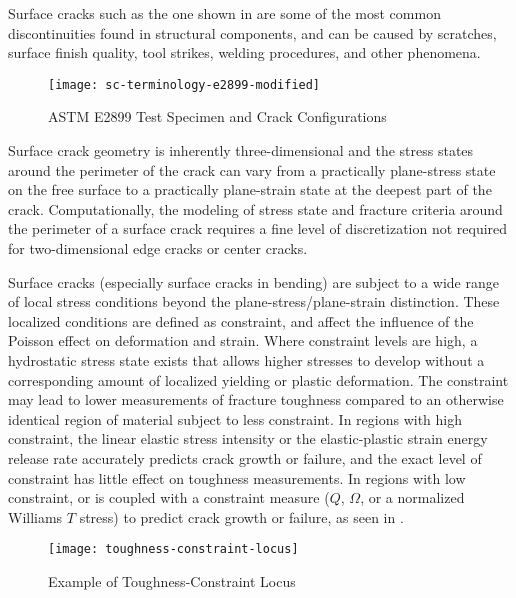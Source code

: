 Surface cracks such as the one shown in  are some of the most common discontinuities found in structural components, and can be caused by scratches, surface finish quality, tool strikes, welding procedures, and other phenomena.
\begin{figure}[tbp]
\centering
\texttt{[image: sc-terminology-e2899-modified]}
\caption[ASTM E2899 Test Specimen and Crack Configurations]{\label{fig:sc-terminology-e2899} ASTM E2899 Test Specimen and Crack Configurations \cite{astme2899}}
\end{figure}
Surface crack geometry is inherently three-dimensional and the stress states around the perimeter of the crack can vary from a practically plane-stress state on the free surface to a practically plane-strain state at the deepest part of the crack.
Computationally, the modeling of stress state and fracture criteria around the perimeter of a surface crack requires a fine level of discretization not required for two-dimensional edge cracks or center cracks.

Surface cracks (especially surface cracks in bending) are subject to a wide range of local stress conditions beyond the plane-stress/plane-strain distinction.
These localized conditions are defined as constraint, and affect the influence of the Poisson effect on deformation and strain.
Where constraint levels are high, a hydrostatic stress state exists that allows higher stresses to develop without a corresponding amount of localized yielding or plastic deformation.
The constraint may lead to lower measurements of fracture toughness compared to an otherwise identical region of material subject to less constraint.
In regions with high constraint, the linear elastic stress intensity \K or the elastic-plastic strain energy release rate \J accurately predicts crack growth or failure, and the exact level of constraint has little effect on toughness measurements.
In regions with low constraint, \K or \J is coupled with a constraint measure (\(Q\), \(\Omega\), or a normalized Williams \(T\) stress) to predict crack growth or failure, as seen in .
\begin{figure}[tbp]
\centering
\texttt{[image: toughness-constraint-locus]}
\caption[Example of Toughness-Constraint Locus]{\label{fig:toughness-constraint-locus} Example of Toughness-Constraint Locus \cite{astme2899}}
\end{figure}

